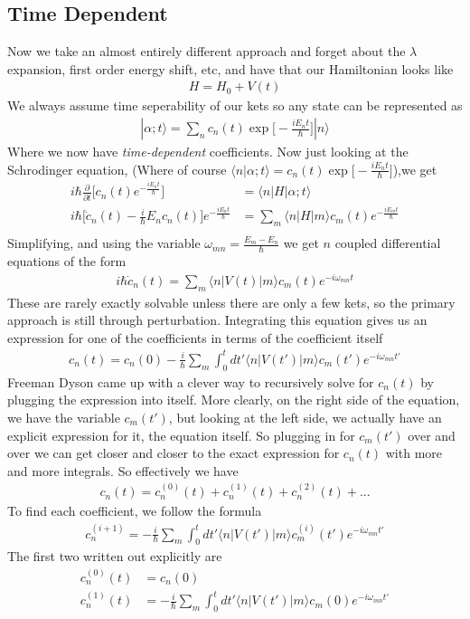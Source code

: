 \subsection{Time Dependent}
Now we take an almost entirely different approach and forget about the $\lambda$ expansion, first order energy shift, etc,  and have that our Hamiltonian looks like
\begin{align}
H = H_0 + V(t)
\end{align}
We always assume time seperability of our kets so any state can be represented as
\begin{align}
|\alpha; t\rangle = \sum_n c_n(t)\exp\Big[-\frac{iE_n t}{\hbar}\Big]|n\rangle
\end{align}
Where we now have \emph{time-dependent} coefficients. Now just looking at the Schrodinger equation, (Where of course $\langle n |\alpha;t\rangle = c_n(t)\exp\Big[-\frac{iE_n t}{\hbar}\Big]$),we get
\begin{align}
i\hbar \frac{\partial}{\partial t} \Big[c_n(t)e^{-\frac{iE_n t}{\hbar}}\Big] &= \langle n| H|\alpha; t\rangle\\
i\hbar\Big[\dot{c}_n(t) - \frac{i}{\hbar}E_nc_n(t)\Big]e^{-\frac{iE_n t}{\hbar}} &= \sum_m \langle n| H|m\rangle c_m(t)e^{-\frac{iE_m t}{\hbar}}\\
\end{align}
Simplifying, and using the variable $\omega_{mn} = \frac{E_m-E_n}{\hbar}$ we get $n$ coupled differential equations of the form 
\begin{align}
i\hbar\dot{c}_n(t) = \sum_m \langle n |V(t)|m\rangle c_m(t) e^{-i\omega_{mn}t}
\end{align}
These are rarely exactly solvable unless there are only a few kets, so the primary approach is still through perturbation. Integrating this equation gives us an expression for one of the coefficients in terms of the coefficient itself
\begin{align}
c_n(t) = c_n(0)-\frac{i}{\hbar}\sum_m \int_0^t dt' \langle n |V(t')|m\rangle c_m(t') e^{-i\omega_{mn}t'}
\end{align}
Freeman Dyson came up with a clever way to recursively solve for $c_n(t)$ by plugging the expression into itself. More clearly, on the right side of the equation, we have the variable $c_m(t')$, but looking at the left side, we actually have an explicit expression for it, the equation itself. So plugging in for $c_m(t')$ over and over we can get closer and closer to the exact expression for $c_n(t)$ with more and more integrals. So effectively we have
\begin{align}
c_n(t) = c_n^{(0)}(t) + c_n^{(1)}(t) + c_n^{(2)}(t) + ...
\end{align}
To find each coefficient, we follow the formula
\begin{align}
c_n^{(i+1)} = -\frac{i}{\hbar}\sum_m \int_0^t dt' \langle n |V(t')|m\rangle c_m^{(i)}(t') e^{-i\omega_{mn}t'}
\end{align}
The first two written out explicitly are
\begin{align}
c_n^{(0)}(t) &= c_n(0)\\
c_n^{(1)}(t) &= -\frac{i}{\hbar}\sum_m \int_0^t dt' \langle n |V(t')|m\rangle c_m(0) e^{-i\omega_{mn}t'}
\end{align}


